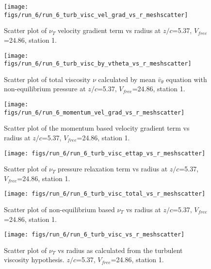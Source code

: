 \begin{figure}[H]
\centering
\texttt{[image: figs/run\_6/run\_6\_turb\_visc\_vel\_grad\_vs\_r\_meshscatter]}
\caption{Scatter plot of $\nu_T$ velocity gradient term vs radius at $z/c$=5.37, $V_{free}$=24.86, station 1.}
\end{figure}


\begin{figure}[H]
\centering
\texttt{[image: figs/run\_6/run\_6\_turb\_visc\_by\_vtheta\_vs\_r\_meshscatter]}
\caption{Scatter plot of total viscosity $\nu$ calculated by mean $\bar{v}_{\theta}$ equation with non-equilibrium pressure at $z/c$=5.37, $V_{free}$=24.86, station 1.}
\end{figure}


\begin{figure}[H]
\centering
\texttt{[image: figs/run\_6/run\_6\_momentum\_vel\_grad\_vs\_r\_meshscatter]}
\caption{Scatter plot of the momentum based velocity gradient term vs radius at $z/c$=5.37, $V_{free}$=24.86, station 1.}
\end{figure}


\begin{figure}[H]
\centering
\texttt{[image: figs/run\_6/run\_6\_turb\_visc\_ettap\_vs\_r\_meshscatter]}
\caption{Scatter plot of $\nu_T$ pressure relaxation term vs radius at $z/c$=5.37, $V_{free}$=24.86, station 1.}
\end{figure}


\begin{figure}[H]
\centering
\texttt{[image: figs/run\_6/run\_6\_turb\_visc\_total\_vs\_r\_meshscatter]}
\caption{Scatter plot of non-equilibrium based $\nu_T$ vs radius at $z/c$=5.37, $V_{free}$=24.86, station 1.}
\end{figure}


\begin{figure}[H]
\centering
\texttt{[image: figs/run\_6/run\_6\_turb\_visc\_vs\_r\_meshscatter]}
\caption{Scatter plot of $\nu_T$ vs radius as calculated from the turbulent viscosity hypothesis. $z/c$=5.37, $V_{free}$=24.86, station 1.}
\end{figure}


